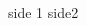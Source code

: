 \documentclass{article}
\newcommand{\startParallel}{\begin{paracol}{2}}
\newcommand{\latin}[1]{#1\switchcolumn}
\newcommand{\vern}[1]{#1\switchcolumn*}
\newcommand{\stopParallel}{\end{paracol}}
\begin{document}
\startParallel

\latin{side 1}
\vern{side2}

\stopParallel
\end{document}
